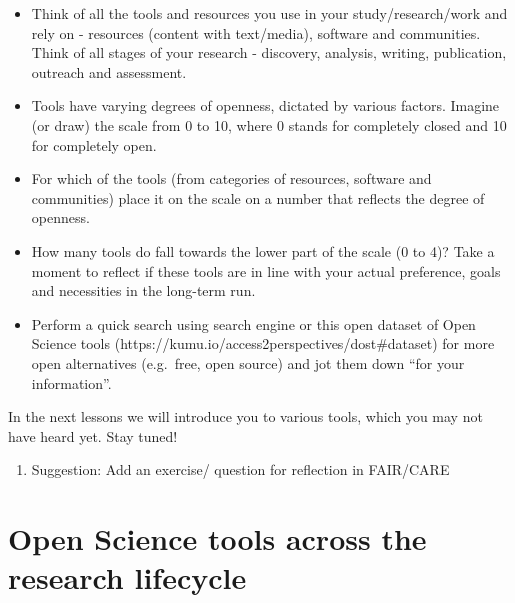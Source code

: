 \documentclass[
  letterpaper,
  DIV=11,
  numbers=noendperiod]{scrreport}
\providecommand{\tightlist}{%
  \setlength{\itemsep}{0pt}\setlength{\parskip}{0pt}}\usepackage{longtable,booktabs,array}
\begin{document}
\begin{itemize}
\tightlist
\item
  Think of all the tools and resources you use in your
  study/research/work and rely on - resources (content with text/media),
  software and communities. Think of all stages of your research -
  discovery, analysis, writing, publication, outreach and assessment.
\item
  Tools have varying degrees of openness, dictated by various factors.
  Imagine (or draw) the scale from 0 to 10, where 0 stands for
  completely closed and 10 for completely open.
\item
  For which of the tools (from categories of resources, software and
  communities) place it on the scale on a number that reflects the
  degree of openness.
\item
  How many tools do fall towards the lower part of the scale (0 to 4)?
  Take a moment to reflect if these tools are in line with your actual
  preference, goals and necessities in the long-term run.
\item
  Perform a quick search using search engine or this open dataset of
  Open Science tools (https://kumu.io/access2perspectives/dost\#dataset)
  for more open alternatives (e.g.~free, open source) and jot them down
  ``for your information''.
\end{itemize}

In the next lessons we will introduce you to various tools, which you
may not have heard yet. Stay tuned!

\begin{enumerate}
\def\labelenumi{\arabic{enumi}.}
\setcounter{enumi}{1}
\tightlist
\item
  Suggestion: Add an exercise/ question for reflection in FAIR/CARE
\end{enumerate}

\hypertarget{open-science-tools-across-the-research-lifecycle}{%
\chapter{Open Science tools across the research
lifecycle}\label{open-science-tools-across-the-research-lifecycle}}
\end{document}
